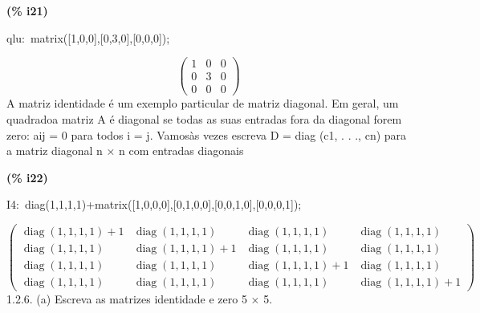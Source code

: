 \documentclass[fleqn]{article}
\begin{document}
\noindent
\begin{minipage}[t]{4.000000em}\color{red}\bfseries
(\% i21)	
\end{minipage}
\begin{minipage}[t]{\textwidth}\color{blue}
qlu:\ matrix([1,0,0],[0,3,0],[0,0,0]);
\end{minipage}
\[\displaystyle \tag{qlu} 
\begin{pmatrix}1 & 0 & 0\\
0 & 3 & 0\\
0 & 0 & 0\end{pmatrix}\mbox{}
\]
A matriz identidade é um exemplo particular de matriz diagonal. Em geral, um quadradoa matriz A é diagonal se todas as suas entradas fora da diagonal forem zero: aij = 0 para todos i = j. Vamosàs vezes escreva D = diag (c1, . . ., cn) para a matriz diagonal n × n com entradas diagonais


\noindent
\begin{minipage}[t]{4.000000em}\color{red}\bfseries
(\% i22)	
\end{minipage}
\begin{minipage}[t]{\textwidth}\color{blue}
I4:\ diag(1,1,1,1)+matrix([1,0,0,0],[0,1,0,0],[0,0,1,0],[0,0,0,1]);\ 
\end{minipage}
\[\displaystyle \tag{I4} 
\begin{pmatrix}\mathop{diag}\left( 1\mathop{,}1\mathop{,}1\mathop{,}1\right) \mathop{+}1 & \mathop{diag}\left( 1\mathop{,}1\mathop{,}1\mathop{,}1\right)  & \mathop{diag}\left( 1\mathop{,}1\mathop{,}1\mathop{,}1\right)  & \mathop{diag}\left( 1\mathop{,}1\mathop{,}1\mathop{,}1\right) \\
\mathop{diag}\left( 1\mathop{,}1\mathop{,}1\mathop{,}1\right)  & \mathop{diag}\left( 1\mathop{,}1\mathop{,}1\mathop{,}1\right) \mathop{+}1 & \mathop{diag}\left( 1\mathop{,}1\mathop{,}1\mathop{,}1\right)  & \mathop{diag}\left( 1\mathop{,}1\mathop{,}1\mathop{,}1\right) \\
\mathop{diag}\left( 1\mathop{,}1\mathop{,}1\mathop{,}1\right)  & \mathop{diag}\left( 1\mathop{,}1\mathop{,}1\mathop{,}1\right)  & \mathop{diag}\left( 1\mathop{,}1\mathop{,}1\mathop{,}1\right) \mathop{+}1 & \mathop{diag}\left( 1\mathop{,}1\mathop{,}1\mathop{,}1\right) \\
\mathop{diag}\left( 1\mathop{,}1\mathop{,}1\mathop{,}1\right)  & \mathop{diag}\left( 1\mathop{,}1\mathop{,}1\mathop{,}1\right)  & \mathop{diag}\left( 1\mathop{,}1\mathop{,}1\mathop{,}1\right)  & \mathop{diag}\left( 1\mathop{,}1\mathop{,}1\mathop{,}1\right) \mathop{+}1\end{pmatrix}\mbox{}
\]
1.2.6. (a) Escreva as matrizes identidade e zero 5 × 5.
\end{document}
